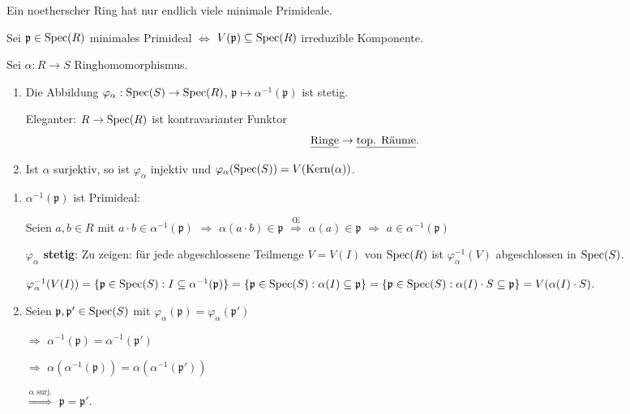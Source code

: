 \documentclass[a4paper, 10pt]{report}
\begin{document}
\begin{Folg}
Ein noetherscher Ring hat nur endlich viele minimale Primideale.

\begin{Bew}
Sei $\mathfrak{p} \in \Spec{R}$ minimales Primideal $\Leftrightarrow$ $V(\mathfrak{p}) \subseteq \Spec{R}$ irreduzible Komponente.
\end{Bew}
\end{Folg}

\begin{Prop}
Sei $\alpha : R \rightarrow S$ Ringhomomorphismus.

\begin{enumerate}
\item Die Abbildung $\varphi_\alpha : \Spec{S} \rightarrow \Spec{R}$, $\mathfrak{p} \mapsto \alpha^{-1}(\mathfrak{p})$ ist stetig.

Eleganter: $R \rightarrow \Spec{R}$ ist kontravarianter Funktor
\[
\KatRing \to \KatTop.
\]

\item Ist $\alpha$ surjektiv, so ist $\varphi_\alpha$ injektiv und $\varphi_\alpha(\Spec{S}) = V(\K{\alpha})$.
\end{enumerate}

\begin{Bew}
\begin{enumerate}
\item $\alpha^{-1}(\mathfrak{p})$ ist Primideal:

Seien $a,b \in R$ mit $a \cdot b \in \alpha^{-1}(\mathfrak{p})$ $\Rightarrow$ $\alpha(a \cdot b) \in \mathfrak{p}$ $\overset{\text{\OE}}\Rightarrow$ $\alpha(a) \in \mathfrak{p}$ $\Rightarrow$ $a \in \alpha^{-1}(\mathfrak{p})$

\textbf{$\varphi_\alpha$ stetig}: Zu zeigen: f\"ur jede abgeschlossene Teilmenge $V = V(I)$ von $\Spec{R}$ ist $\varphi_\alpha^{-1}(V)$ abgeschlossen in $\Spec{S}$.

$\varphi_\alpha^{-1}(V(I)) = \{ \mathfrak{p} \in \Spec{S} : I \subseteq
\alpha^{-1}(\mathfrak{p}) \} = \{ \mathfrak{p} \in \Spec{S} : \alpha(I)
\subseteq \mathfrak{p} \} = \{ \mathfrak{p} \in \Spec{S} : \alpha(I) \cdot S
\subseteq \mathfrak{p} \} = V(\alpha(I) \cdot S)$.

\item
Seien $\mathfrak{p}, \mathfrak{p'} \in \Spec{S}$ mit $\varphi_\alpha(\mathfrak{p}) = \varphi_\alpha(\mathfrak{p'})$

$\Rightarrow$ $\alpha^{-1}(\mathfrak{p}) = \alpha^{-1}(\mathfrak{p'})$

$\Rightarrow$ $\alpha(\alpha^{-1}(\mathfrak{p})) = \alpha(\alpha^{-1}(\mathfrak{p'}))$

$\overset{\alpha \text{ surj.}}\Rightarrow$ $\mathfrak{p} = \mathfrak{p'}$.

\end{enumerate}
\end{Bew}
\end{Prop}
\end{document}
